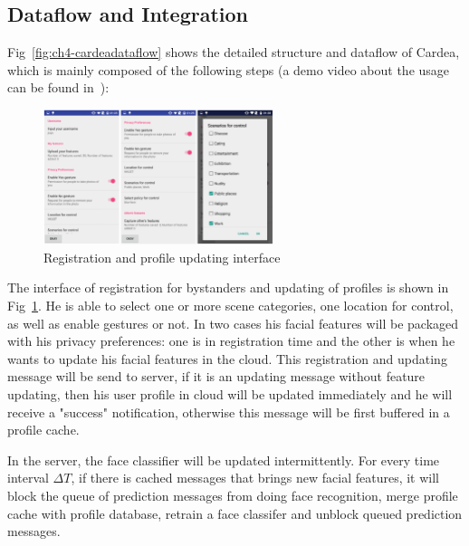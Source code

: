 \subsection{Dataflow and Integration}
Fig~\ref{fig:ch4-cardeadataflow} shows the detailed structure and dataflow of Cardea, which is mainly composed of the following steps (a demo video about the usage can be found in~\cite{links:cardeavid}):

\begin{description}[leftmargin=0cm]

\begin{figure}[!htbp]
    \centering
    \includegraphics[width=0.6\textwidth]{figure/ch4-reg.png}
    \caption{Registration and profile updating interface}
    \label{fig:ch4-reg}
\end{figure}

  \item[{Registration and Profile updating:}] The interface of registration for bystanders and updating of profiles is shown in Fig~\ref{fig:ch4-reg}. He is able to select one or more scene categories, one location for control, as well as enable gestures or not. In two cases his facial features will be packaged with his privacy preferences: one is in registration time and the other is when he wants to update his facial features in the cloud. This registration and updating message will be send to server, if it is an updating message without feature updating, then his user profile in cloud will be updated immediately and he will receive a "success" notification, otherwise this message will be first buffered in a profile cache.

  \item[{Face classifier updating:}] In the server, the face classifier will be updated intermittently. For every time interval $\Delta T$, if there is cached messages that brings new facial features, it will  block the queue of prediction messages from doing face recognition,  merge profile cache with profile database,  retrain a face classifer and  unblock queued prediction messages.


\end{description}
